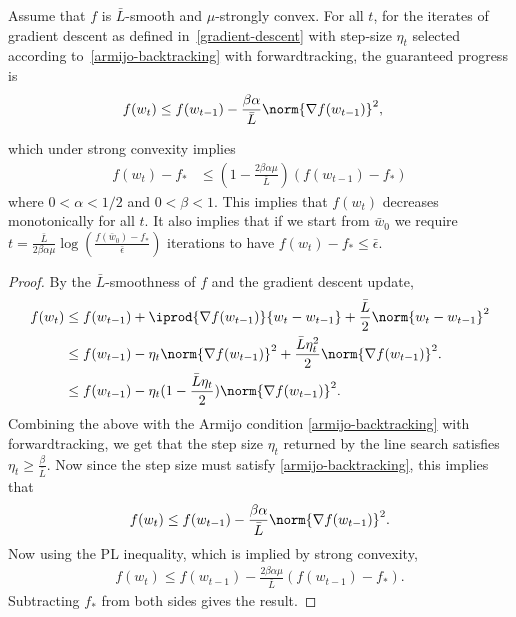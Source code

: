 \documentclass[10pt]{article} %
\begin{document}
\begin{lemma}
\label{lem:GD-Armijo}
Assume that $f$ is $\bar{L}$-smooth and $\mu$-strongly convex. For all $t$, for the iterates of gradient descent as defined in~\eqref{gradient-descent} with step-size $\eta_t$ selected according to~\eqref{armijo-backtracking} with forwardtracking, the guaranteed progress is
    \begin{align}
    \label{eq:GD-Armijo}
        f(w_{t})
        &\leq f(w_{t-1}) - \frac{\beta\alpha}{\bar{L}}\norm{\nabla f(w_{t-1})}^2,
    \end{align}
\end{lemma}
which under strong convexity implies 
    \begin{align*}
        f(w_{t})  - f_* 
        &\leq (1 - \frac{2\beta\alpha\mu}{\bar{L}})(f(w_{t-1})  - f_*)
    \end{align*} 
where $0 < \alpha < 1/2$ and $0 < \beta < 1$. This implies that $f(w_t)$ decreases monotonically for all $t$. It also implies that if we start from $\bar{w}_0$ we require $t = \frac{\bar{L}}{2\beta\alpha\mu}\log\left(\frac{f(\bar{w}_0) - f_*}{\bar{\epsilon}}\right)$ iterations to have $f(w_t) - f_* \leq \bar{\epsilon}$.
\begin{proof}
By the $\bar{L}$-smoothness of $f$ and the gradient descent update,
\begin{align*}
    f(w_t) &\leq f(w_{t-1}) + \iprod{\nabla f(w_{t-1})}{w_t - w_{t-1}} + \frac{\bar{L}}{2}\norm{w_t - w_{t-1}}^2 \\
    &\leq f(w_{t-1}) - \eta_{t}\norm{\nabla f(w_{t-1})}^2 + \frac{\bar{L}\eta_{t}^2}{2}\norm{\nabla f(w_{t-1})}^2. \\
    &\leq f(w_{t-1}) - \eta_{t}(1 - \frac{\bar{L}\eta_{t}}{2})\norm{\nabla f(w_{t-1})}^2.
\end{align*}
Combining the above with the Armijo condition \ref{armijo-backtracking} with forwardtracking, we get that the step size $\eta_{t}$ returned by the line search satisfies $\eta_{t} \geq \frac{\beta}{\bar{L}}$. Now since the step size must satisfy \ref{armijo-backtracking}, this implies that 
\begin{align*}
    f(w_{t}) \leq f(w_{t-1}) - \frac{\beta \alpha}{\bar{L}}  \norm{\nabla f(w_{t-1})}^2.
\end{align*}
Now using the PL inequality, which is implied by strong convexity,
\begin{align*}
    f(w_{t}) \leq f(w_{t-1}) - \frac{2\beta\alpha\mu}{\bar{L}} (f(w_{t-1}) - f_*).
\end{align*}
Subtracting $f_*$ from both sides gives the result.
\end{proof}
\end{document}
